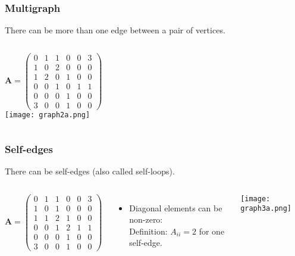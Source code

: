\documentclass[10pt,aspectratio=169,dvipsnames]{beamer}
\let\olditem\item
\renewcommand{\item}{%
\olditem\vspace{5pt}}
\begin{document}
\begin{frame}
\frametitle{Multigraph}
There can be more than one edge between a pair of vertices.
  \begin{columns}
\begin{equation*}
\mathbf{A}=\left(\begin{matrix}
0 & 1 & 1 & 0 & 0 & 3\\
1 & 0 & 2 & 0 & 0 & 0\\
1 & 2 & 0 & 1 & 0 & 0\\
0 & 0 & 1 & 0 & 1 & 1\\
0 & 0 & 0 & 1 & 0 & 0\\
3 & 0 & 0 & 1 & 0 & 0
\end{matrix}\right)
\end{equation*}
\texttt{[image: graph2a.png]}
  \end{columns}
\end{frame}
\begin{frame}
\frametitle{Self-edges}
There can be \alert{self-edges} (also called self-loops).
  \begin{columns}
\begin{equation*}
\mathbf{A}=\left(\begin{matrix}
0 & 1 & 1 & 0 & 0 & 3\\
1 & 0 & 1 & 0 & 0 & 0\\
1 & 1 & 2 & 1 & 0 & 0\\
0 & 0 & 1 & 2 & 1 & 1\\
0 & 0 & 0 & 1 & 0 & 0\\
3 & 0 & 0 & 1 & 0 & 0
\end{matrix}\right)
\end{equation*}
  \begin{itemize}
\item Diagonal elements can be non-zero:\\
Definition: $A_{ii}=2$ for one self-edge.
\end{itemize}
\texttt{[image: graph3a.png]}
  \end{columns}
\end{frame}
\end{document}
